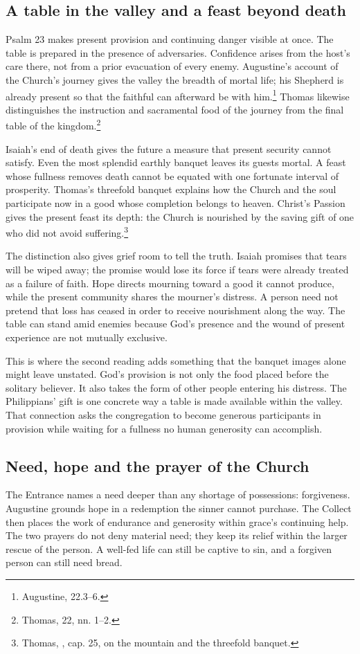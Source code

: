 \subsection{A table in the valley and a feast beyond death}
Psalm 23 makes present provision and continuing danger visible at once. The table is prepared in the presence of adversaries. Confidence arises from the host's care there, not from a prior evacuation of every enemy. Augustine's account of the Church's journey gives the valley the breadth of mortal life; his Shepherd is already present so that the faithful can afterward be with him.\footnote{Augustine,  22.3--6.} Thomas likewise distinguishes the instruction and sacramental food of the journey from the final table of the kingdom.\footnote{Thomas,  22, nn. 1--2.}

Isaiah's end of death gives the future a measure that present security cannot satisfy. Even the most splendid earthly banquet leaves its guests mortal. A feast whose fullness removes death cannot be equated with one fortunate interval of prosperity. Thomas's threefold banquet explains how the Church and the soul participate now in a good whose completion belongs to heaven. Christ's Passion gives the present feast its depth: the Church is nourished by the saving gift of one who did not avoid suffering.\footnote{Thomas, , cap. 25, on the mountain and the threefold banquet.}

The distinction also gives grief room to tell the truth. Isaiah promises that tears will be wiped away; the promise would lose its force if tears were already treated as a failure of faith. Hope directs mourning toward a good it cannot produce, while the present community shares the mourner's distress. A person need not pretend that loss has ceased in order to receive nourishment along the way. The table can stand amid enemies because God's presence and the wound of present experience are not mutually exclusive.

This is where the second reading adds something that the banquet images alone might leave unstated. God's provision is not only the food placed before the solitary believer. It also takes the form of other people entering his distress. The Philippians' gift is one concrete way a table is made available within the valley. That connection asks the congregation to become generous participants in provision while waiting for a fullness no human generosity can accomplish.

\subsection{Need, hope and the prayer of the Church}
The Entrance names a need deeper than any shortage of possessions: forgiveness. Augustine grounds hope in a redemption the sinner cannot purchase. The Collect then places the work of endurance and generosity within grace's continuing help. The two prayers do not deny material need; they keep its relief within the larger rescue of the person. A well-fed life can still be captive to sin, and a forgiven person can still need bread.

